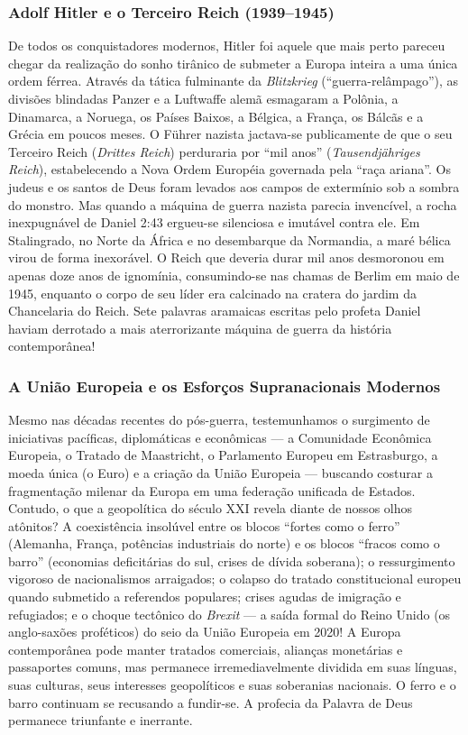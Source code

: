 \subsubsection*{Adolf Hitler e o Terceiro Reich (1939–1945)}
De todos os conquistadores modernos, Hitler foi aquele que mais perto pareceu chegar da realização do sonho tirânico de submeter a Europa inteira a uma única ordem férrea. Através da tática fulminante da \textit{Blitzkrieg} (``guerra-relâmpago''), as divisões blindadas Panzer e a Luftwaffe alemã esmagaram a Polônia, a Dinamarca, a Noruega, os Países Baixos, a Bélgica, a França, os Bálcãs e a Grécia em poucos meses. O Führer nazista jactava-se publicamente de que o seu Terceiro Reich (\textit{Drittes Reich}) perduraria por ``mil anos'' (\textit{Tausendjähriges Reich}), estabelecendo a Nova Ordem Européia governada pela ``raça ariana''. Os judeus e os santos de Deus foram levados aos campos de extermínio sob a sombra do monstro.
Mas quando a máquina de guerra nazista parecia invencível, a rocha inexpugnável de Daniel 2:43 ergueu-se silenciosa e imutável contra ele. Em Stalingrado, no Norte da África e no desembarque da Normandia, a maré bélica virou de forma inexorável. O Reich que deveria durar mil anos desmoronou em apenas doze anos de ignomínia, consumindo-se nas chamas de Berlim em maio de 1945, enquanto o corpo de seu líder era calcinado na cratera do jardim da Chancelaria do Reich. Sete palavras aramaicas escritas pelo profeta Daniel haviam derrotado a mais aterrorizante máquina de guerra da história contemporânea!


\subsubsection*{A União Europeia e os Esforços Supranacionais Modernos}
Mesmo nas décadas recentes do pós-guerra, testemunhamos o surgimento de iniciativas pacíficas, diplomáticas e econômicas — a Comunidade Econômica Europeia, o Tratado de Maastricht, o Parlamento Europeu em Estrasburgo, a moeda única (o Euro) e a criação da União Europeia — buscando costurar a fragmentação milenar da Europa em uma federação unificada de Estados.
Contudo, o que a geopolítica do século XXI revela diante de nossos olhos atônitos? A coexistência insolúvel entre os blocos ``fortes como o ferro'' (Alemanha, França, potências industriais do norte) e os blocos ``fracos como o barro'' (economias deficitárias do sul, crises de dívida soberana); o ressurgimento vigoroso de nacionalismos arraigados; o colapso do tratado constitucional europeu quando submetido a referendos populares; crises agudas de imigração e refugiados; e o choque tectônico do \textit{Brexit} — a saída formal do Reino Unido (os anglo-saxões proféticos) do seio da União Europeia em 2020!
A Europa contemporânea pode manter tratados comerciais, alianças monetárias e passaportes comuns, mas permanece irremediavelmente dividida em suas línguas, suas culturas, seus interesses geopolíticos e suas soberanias nacionais. O ferro e o barro continuam se recusando a fundir-se. A profecia da Palavra de Deus permanece triunfante e inerrante.



